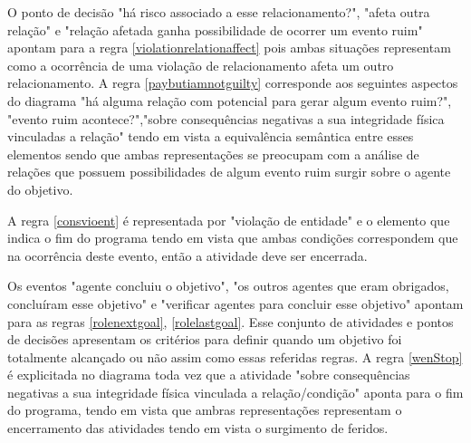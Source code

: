 O ponto de decisão "há risco associado a esse relacionamento?", "afeta  outra relação" e "relação afetada ganha possibilidade de ocorrer um evento ruim" apontam para a regra \ref{violationrelationaffect} pois ambas situações representam como a ocorrência de uma violação de relacionamento afeta um outro relacionamento. A regra \ref{paybutiamnotguilty} corresponde aos seguintes aspectos do diagrama "há alguma relação com potencial para gerar algum evento ruim?", "evento ruim acontece?","sobre consequências negativas a sua integridade física vinculadas a relação" tendo em vista a equivalência semântica entre esses elementos sendo que ambas representações se preocupam com a análise de relações que possuem possibilidades de algum evento ruim surgir sobre o agente do objetivo. 

A regra \ref{consvioent} é representada por "violação de entidade" e o elemento que indica o fim do programa tendo em vista que ambas condições correspondem que na ocorrência deste evento, então a atividade deve ser encerrada.

Os eventos "agente concluiu o objetivo", "os outros agentes que eram obrigados, concluíram esse objetivo" e "verificar agentes para concluir esse objetivo" apontam para as regras \ref{rolenextgoal}, \ref{rolelastgoal}. Esse conjunto de atividades e pontos de decisões apresentam os critérios para definir quando um objetivo foi totalmente alcançado ou não assim como essas referidas regras.  A regra \ref{wenStop} é explicitada no diagrama toda vez que a atividade "sobre consequências negativas a sua integridade física vinculada a relação/condição" aponta para o fim do programa, tendo em vista que ambras representações representam o encerramento das atividades tendo em vista o surgimento de feridos. 

